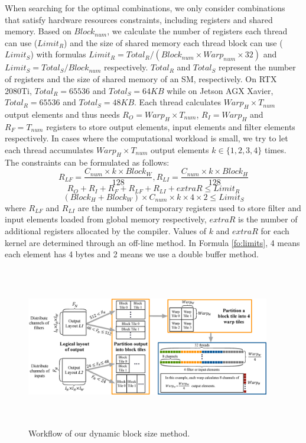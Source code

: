 When searching for the optimal combinations, we only consider combinations that satisfy hardware resources constraints, including registers and shared memory.
Based on $Block_{num}$, we calculate the number of registers each thread can use ($Limit_R$) and the size of shared memory each thread block can use ($Limit_S$) with formulas $Limit_R=Total_R/(Block_{num}\times Warp_{num} \times 32)$ and $Limit_S=Total_S/Block_{num}$ respectively. $Total_R$ and $Total_S$ represent the number of registers and the size of shared memory of an SM, respectively. On RTX 2080Ti, $Total_R=65536$ and $Total_S=64KB$ while  on Jetson AGX Xavier, $Total_R=65536$ and $Total_S=48KB$.
Each thread calculates $Warp_H \times T_{num}$ output elements and thus needs $R_O=Warp_H \times T_{num}$, $R_I=Warp_H$ and $R_F=T_{num}$ registers to store output elements, input elements and filter elements respectively.
In cases where the computational workload is small, we try to let each thread accumulates $Warp_H \times T_{num}$ output elements $k \in \{1,2,3,4\}$ times.
The constraints can be formulated as follows:
\begin{equation}\nonumber
R_{LF}=\frac{C_{num} \times k \times Block_W}{128},R_{LI}=\frac{C_{num} \times k \times Block_H}{128}
\end{equation}
\begin{equation}
    \label{fo:limitr}
R_O+R_I+R_F+R_{LF}+R_{LI}+extraR \leq Limit_R
\end{equation}
\begin{equation}
    \label{fo:limits}
(Block_H+Block_W)\times C_{num} \times k \times 4 \times 2 \leq Limit_S
\end{equation}
where $R_{LF}$ and $R_{LI}$ are the number of temporary registers used to store filter and input elements loaded from global memory respectively, $extraR$ is the number of additional registers allocated by the compiler. Values of $k$ and $extraR$ for each kernel are determined through an off-line method. In Formula \ref{fo:limits}, 4 means each element has 4 bytes and 2 means we use a double buffer method.
\begin{figure}
	\centering
    \includegraphics[width=0.95\textwidth,height=7cm]{./figure/pwworkflow.eps}
    \caption{Workflow of our dynamic block size method.} \label{fig:pwworkflow}
\end{figure}
